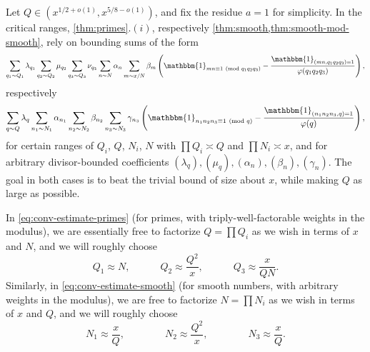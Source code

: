 \documentclass[reqno,11pt]{amsart}
\theoremstyle{remark}
\numberwithin{equation}{section}
\newcommand{\one}{\mathbbm{1}}
\renewcommand{\pmod}[1]{\ (\textnormal{mod } #1)}
\begin{document}
Let $Q \in (x^{1/2+o(1)}, x^{5/8-o(1)})$, and fix the residue $a = 1$ for simplicity.
In the critical ranges, \cref{thm:primes}.$(i)$, respectively \cref{thm:smooth,thm:smooth-mod-smooth}, rely on bounding sums of the form
\begin{equation} \label{eq:conv-estimate-primes}
    \sum_{q_1 \sim Q_1} \lambda_{q_1} \sum_{q_2 \sim Q_2} \mu_{q_2} \sum_{q_3 \sim Q_3} \nu_{q_3} \sum_{n \sim N} \alpha_{n} \sum_{m \sim x/N} \beta_{m} \left(\one_{mn \equiv 1 \pmod{q_1q_2q_3}} - \frac{\one_{(mn, q_1q_2q_3) = 1}}{\varphi(q_1 q_2 q_3)}\right),
\end{equation}
respectively
\begin{equation} \label{eq:conv-estimate-smooth}
    \sum_{q \sim Q} \lambda_{q} \sum_{n_1 \sim N_1} \alpha_{n_1} \sum_{n_2 \sim N_2} \beta_{n_2} \sum_{n_3 \sim N_3} \gamma_{n_3} \left(\one_{n_1 n_2 n_3 \equiv 1 \pmod{q}} - \frac{\one_{(n_1 n_2 n_3, q) = 1}}{\varphi(q)}\right),
\end{equation}
for certain ranges of $Q_i$, $Q$, $N_i$, $N$ with $\prod Q_i \asymp Q$ and $\prod N_i \asymp x$, and for arbitrary divisor-bounded coefficients $(\lambda_q), (\mu_q), (\alpha_n), (\beta_n), (\gamma_n)$. The goal in both cases is to beat the trivial bound of size about $x$, while making $Q$ as large as possible. 

In \cref{eq:conv-estimate-primes} (for primes, with triply-well-factorable weights in the modulus), we are essentially free to factorize $Q = \prod Q_i$ as we wish in terms of $x$ and $N$, and we will roughly choose 
\begin{equation} \label{eq:ranges-primes}
    Q_1 \approx N, \qquad\quad 
    Q_2 \approx \frac{Q^2}{x},
    \qquad\quad 
    Q_3 \approx \frac{x}{QN}.
\end{equation}
Similarly, in \cref{eq:conv-estimate-smooth} (for smooth numbers, with arbitrary weights in the modulus), we are free to factorize $N = \prod N_i$ as we wish in terms of $x$ and $Q$, and we will roughly choose
\begin{equation} \label{eq:ranges-smooth}
    N_1 \approx \frac{x}{Q},
    \qquad\qquad 
    N_2 \approx \frac{Q^2}{x},
    \qquad\qquad 
    N_3 \approx \frac{x}{Q}.
\end{equation}
\end{document}
